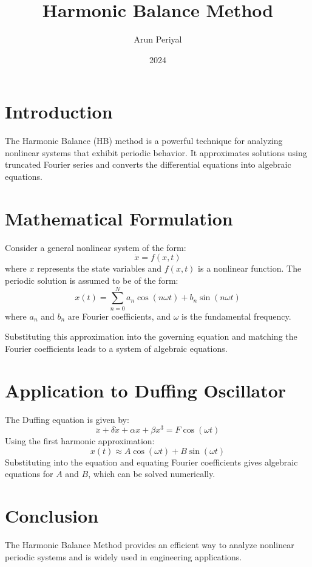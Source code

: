 \documentclass{article}
\title{Harmonic Balance Method}
\author{Arun Periyal}
\date{2024}
\begin{document}
\maketitle

\tableofcontents

\section{Introduction}
The Harmonic Balance (HB) method is a powerful technique for analyzing nonlinear systems that exhibit periodic behavior. It approximates solutions using truncated Fourier series and converts the differential equations into algebraic equations.

\section{Mathematical Formulation}
Consider a general nonlinear system of the form:
\begin{equation}
    \dot{x} = f(x, t)
\end{equation}
where $x$ represents the state variables and $f(x,t)$ is a nonlinear function. The periodic solution is assumed to be of the form:
\begin{equation}
    x(t) = \sum_{n=0}^{N} a_n \cos(n\omega t) + b_n \sin(n\omega t)
\end{equation}
where $a_n$ and $b_n$ are Fourier coefficients, and $\omega$ is the fundamental frequency.

Substituting this approximation into the governing equation and matching the Fourier coefficients leads to a system of algebraic equations.

\section{Application to Duffing Oscillator}
The Duffing equation is given by:
\begin{equation}
    \ddot{x} + \delta \dot{x} + \alpha x + \beta x^3 = F \cos(\omega t)
\end{equation}
Using the first harmonic approximation:
\begin{equation}
    x(t) \approx A \cos(\omega t) + B \sin(\omega t)
\end{equation}
Substituting into the equation and equating Fourier coefficients gives algebraic equations for $A$ and $B$, which can be solved numerically.

\section{Conclusion}
The Harmonic Balance Method provides an efficient way to analyze nonlinear periodic systems and is widely used in engineering applications.
\end{document}
